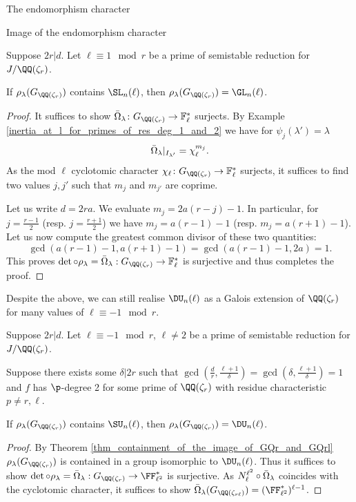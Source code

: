 \documentclass[11pt,a4paper]{article}
\newcommand{\Fl}{\mathbb{F}_\ell}
\newcommand{\Qr}{{\QQ(\zeta_r)}}
\newcommand{\GQr}{G_{\QQ(\zeta_{r})}}
\newcommand{\GQrl}{G_{\QQ(\zeta_{r\ell})}}
\begin{document}
\begin{section}{The endomorphism character}
\begin{subsection}{Image of the endomorphism character}
\begin{proposition}
\label{Prop_l_1_mod_r_IGP}
Suppose $2r|d$. Let  $\ell \equiv 1 \mod{r}$ be a prime of semistable reduction for $J/\Qr$. 

 
 If $\rho_\lambda(\GQr)$ contains $\SL_n(\ell) $, then $\rho_\lambda(\GQr) = \GL_n(\ell)$.
\end{proposition}


\begin{proof}
It suffices to show $\Bar{\Omega}_\lambda\colon \GQr \rightarrow \Fl^*$ surjects. By Example \ref{inertia_at_l_for_primes_of_res_deg_1_and_2} we have for $ \psi_j(\lambda') = \lambda$
\[
\Bar{\Omega}_\lambda|_{I_{\lambda'}} = \chi_\ell^{m_j}.
\]
As the mod $\ell$ cyclotomic character $\chi_\ell\colon \GQr \rightarrow \Fl^*$ surjects, it suffices to find two values $j,j'$ such that $m_j$ and $m_{j'}$ are coprime.

Let us write $d=2ra$. We evaluate $m_j = 2a(r-j)-1$. In particular, for $j= \frac{r-1}{2}$ (resp. $j = \frac{r+1}{2}$) we have $m_j = a(r-1)-1 $ (resp. $m_j = a(r+1)-1 $).
Let us now compute the greatest common divisor of these two quantities:
\[\gcd(a(r-1)-1, a(r+1)-1) = \gcd(a(r-1)-1, 2a) = 1.\]
This proves $\det \circ \rho_\lambda = \Bar{\Omega}_\lambda: \GQr \rightarrow \Fl^*$ is surjective and thus completes the proof. 
\end{proof}

Despite the above, we can still realise $\DU_n(\ell)$ as a Galois extension of $\Qr$ for many values of $\ell \equiv -1 \mod{r}$.

\begin{proposition}
\label{prop_DU_image}
Suppose $2r|d$. Let $\ell \equiv -1 \mod{r}$, $\ell \neq 2$ be a prime of semistable reduction for $J/\Qr$.

Suppose there exists some $\delta|2r$ such that $\gcd(\frac{d}{r},\frac{\ell+1}{\delta})= \gcd(\delta, \frac{\ell+1}{\delta})=1$ and $f$ has $\p$-degree 2 for some prime of $\Qr$ with residue characteristic $p \neq r,\ell$.

If $\rho_\lambda(\GQr)$ contains $\SU_n(\ell)$, then $\rho_\lambda(\GQr) = \DU_n(\ell)$.
\end{proposition}


\begin{proof}
By Theorem \ref{thm_containment_of_the_image_of_GQr_and_GQrl} $\rho_\lambda(\GQr)$ is contained in a group isomorphic to $ \DU_n(\ell)$.
Thus it suffices to show $\det \circ \rho_\lambda = \Bar{\Omega}_\lambda : \GQr \rightarrow \FF_{\ell^2}^*$ is surjective. As $N^{\ell^2}_{\ell} \circ \Bar{\Omega}_\lambda$ coincides with the cyclotomic character, it suffices to show $\Bar{\Omega}_\lambda(\GQrl) = (\FF_{\ell^2}^*)^{\ell -1}$.


\end{proof}
\end{subsection}
\end{section}
\end{document}

